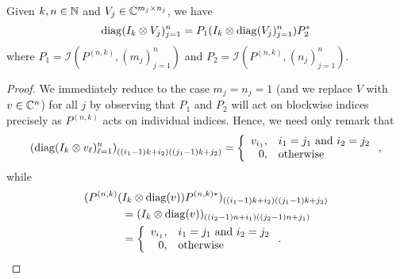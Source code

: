 \begin{lemma}
  Given $k, n \in \mathbb{N}$ and $V_j \in \mathbb{C}^{m_j \times n_j}$, we have \[\operatorname{diag}(I_k \otimes V_j)_{j = 1}^n =  P_1 (I_k \otimes \operatorname{diag}(V_j)_{j = 1}^n) P_2^*\] where $P_1 = \mathcal{I}(P^{(n, k)}, (m_j)_{j = 1}^n)$ and $P_2 = \mathcal{I}(P^{(n, k)}, (n_j)_{j = 1}^n)$. \label{lem:diag_kron_perm}
\end{lemma}

\begin{proof}
  We immediately reduce to the case $m_j = n_j = 1$ (and we replace $V$ with $v \in \mathbb{C}^n$) for all $j$ by observing that $P_1$ and $P_2$ will act on blockwise indices precisely as $P^{(n, k)}$ acts on individual indices.  Hence, we need only remark that \[\left(\diag(I_k \otimes v_\ell)_{\ell = 1}^n\right)_{((i_1 - 1)k + i_2) ((j_1 - 1)k + j_2)} = \left\{\begin{array}{r@{,\quad}l} v_{i_1} & i_1 = j_1 \ \text{and} \ i_2 = j_2 \\ 0 & \text{otherwise} \end{array}\right.,\] while \begin{align*} (P^{(n, k)} (&I_k \otimes \diag(v)) P^{(n, k)*})_{((i_1 - 1)k + i_2) ((j_1 - 1)k + j_2)} \\ &= (I_k \otimes \diag(v))_{((i_2 - 1)n + i_1) ((j_2 - 1)n + j_1)} \\ &= \left\{\begin{array}{r@{,\quad}l} v_{i_1} & i_1 = j_1 \ \text{and} \ i_2 = j_2 \\ 0 & \text{otherwise} \end{array}\right..\end{align*}
\end{proof}

